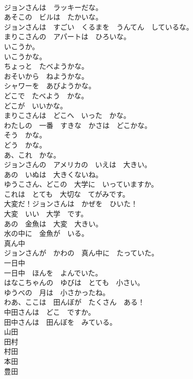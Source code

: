 \documentclass[8pt]{extreport}
\begin{document}
\begin{CJK}{UTF8}{min}
\\	ジョンさんは　ラッキーだな。	
\\	あそこの　ビルは　たかいな。	
\\	ジョンさんは　すごい　くるまを　うんてん　しているな。	
\\	まりこさんの　アパートは　ひろいな。	
\\	いこうか。	
\\	いこうかな。	
\\	ちょっと　たべようかな。	
\\	おそいから　ねようかな。	
\\	シャワーを　あびようかな。	
\\	どこで　たべよう　かな。	
\\	どこが　いいかな。	
\\	まりこさんは　どこへ　いった　かな。	
\\	わたしの　一番　すきな　かさは　どこかな。	
\\	そう　かな。	
\\	どう　かな。	
\\	あ、これ　かな。	
\\	ジョンさんの　アメリカの　いえは　大きい。	
\\	あの　いぬは　大きくないね。	
\\	ゆうこさん、どこの　大学に　いっていますか。	
\\	これは　とても　大切な　てがみです。	
\\	大変だ！ジョンさんは　かぜを　ひいた！	
\\	大変　いい　大学　です。	
\\	あの　金魚は　大変　大きい。	
\\	水の中に　金魚が　いる。	
\\	真ん中	
\\	ジョンさんが　かわの　真ん中に　たっていた。	
\\	一日中	
\\	一日中　ほんを　よんでいた。	
\\	はなこちゃんの　ゆびは　とても　小さい。	
\\	ゆうべの　月は　小さかったね。	
\\	わあ、ここは　田んぼが　たくさん　ある！	
\\	中田さんは　どこ　ですか。	
\\	田中さんは　田んぼを　みている。	
\\	山田	
\\	田村	
\\	村田	
\\	本田	
\\	豊田	

\end{CJK}
\end{document}
